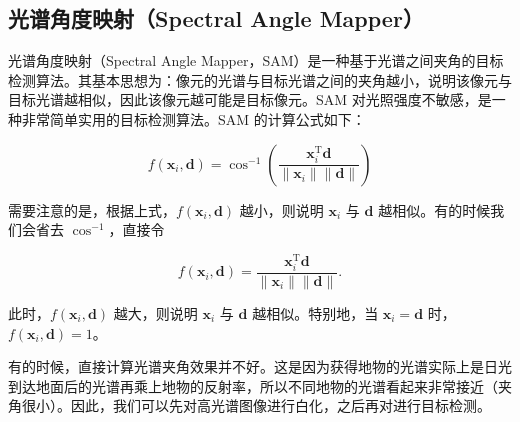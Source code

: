 \subsection{光谱角度映射（Spectral Angle Mapper）}

光谱角度映射（Spectral Angle Mapper，SAM）是一种基于光谱之间夹角的目标检测算法。其基本思想为：像元的光谱与目标光谱之间的夹角越小，说明该像元与目标光谱越相似，因此该像元越可能是目标像元。SAM 对光照强度不敏感，是一种非常简单实用的目标检测算法。SAM 的计算公式如下：

\[
    f(\bm{x}_{i}, \bm{d}) = \cos^{-1}\left(\frac{\bm{x}_{i}^{\mathrm{T}}\bm{d}}{\|\bm{x}_{i}\|\|\bm{d}\|}\right)
\]

需要注意的是，根据上式，\(f(\bm{x}_{i}, \bm{d})\) 越小，则说明 \(\bm{x}_{i}\) 与 \(\bm{d}\) 越相似。有的时候我们会省去 \(\cos^{-1}\)，直接令

\[
    f(\bm{x}_{i}, \bm{d}) = \frac{\bm{x}_{i}^{\mathrm{T}}\bm{d}}{\|\bm{x}_{i}\|\|\bm{d}\|}.
\]

此时，\(f(\bm{x}_{i}, \bm{d})\) 越大，则说明 \(\bm{x}_{i}\) 与 \(\bm{d}\) 越相似。特别地，当 \(\bm{x}_{i} = \bm{d}\) 时，\(f(\bm{x}_{i}, \bm{d}) = 1\)。

有的时候，直接计算光谱夹角效果并不好。这是因为获得地物的光谱实际上是日光到达地面后的光谱再乘上地物的反射率，所以不同地物的光谱看起来非常接近（夹角很小）。因此，我们可以先对高光谱图像进行白化，之后再对进行目标检测。